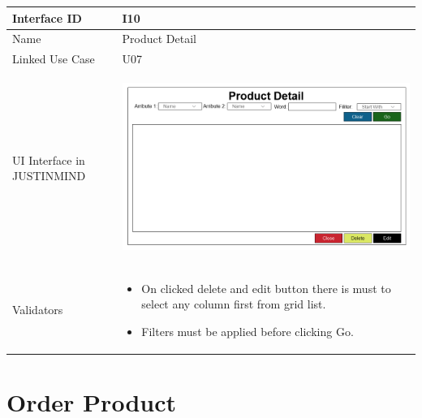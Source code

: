 \documentclass[12pt,a4paper]{report}
\begin{document}
\begin{tabular}{ | m{3cm} | m{12cm}| } \hline

Interface ID &  I10 \\\hline

Name  &  Product Detail \\ \hline

Linked Use Case & U07	 \\ \hline

UI Interface in JUSTINMIND & \begin{center} \includegraphics[scale=0.3]{./UIs for Latex Reports/UI-010 ViewAndDelete Products@1x.png}\end{center}  \\ \hline

Validators & 
\begin{itemize}
\item   On clicked delete and edit button there is must to select any column first from grid list. 
\item  Filters must be applied before clicking Go.


\end{itemize}
\\ \hline

\end{tabular} 
\section{Order Product}
\end{document}

